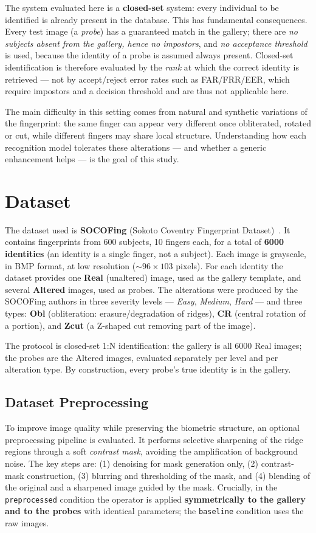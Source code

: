 \documentclass[11pt,a4paper]{article}
\begin{document}
The system evaluated here is a \textbf{closed-set} system: every individual to be
identified is already present in the database. This has fundamental consequences.
Every test image (a \emph{probe}) has a guaranteed match in the gallery; there are
\emph{no subjects absent from the gallery, hence no impostors}, and \emph{no
acceptance threshold} is used, because the identity of a probe is assumed always
present. Closed-set identification is therefore evaluated by the \emph{rank} at
which the correct identity is retrieved --- not by accept/reject error rates such
as FAR/FRR/EER, which require impostors and a decision threshold and are thus not
applicable here.

The main difficulty in this setting comes from natural and synthetic variations
of the fingerprint: the same finger can appear very different once obliterated,
rotated or cut, while different fingers may share local structure. Understanding
how each recognition model tolerates these alterations --- and whether a generic
enhancement helps --- is the goal of this study.

\section{Dataset}
The dataset used is \textbf{SOCOFing} (Sokoto Coventry Fingerprint
Dataset)~\cite{socofing}. It contains fingerprints from \num{600} subjects,
\num{10} fingers each, for a total of \textbf{\num{6000} identities} (an identity
is a single finger, not a subject). Each image is grayscale, in BMP format, at
low resolution ($\sim\!96\times103$ pixels). For each identity the dataset
provides one \textbf{Real} (unaltered) image, used as the gallery template, and
several \textbf{Altered} images, used as probes. The alterations were produced by
the SOCOFing authors in three severity levels --- \emph{Easy}, \emph{Medium},
\emph{Hard} --- and three types: \textbf{Obl} (obliteration: erasure/degradation
of ridges), \textbf{CR} (central rotation of a portion), and \textbf{Zcut} (a
Z-shaped cut removing part of the image).

The protocol is closed-set 1:N identification: the gallery is all \num{6000} Real
images; the probes are the Altered images, evaluated separately per level and per
alteration type. By construction, every probe's true identity is in the gallery.

\subsection{Dataset Preprocessing}
\label{sec:prep}
To improve image quality while preserving the biometric structure, an optional
preprocessing pipeline is evaluated. It performs selective sharpening of the ridge
regions through a soft \emph{contrast mask}, avoiding the amplification of
background noise. The key steps are: (1) denoising for mask generation only, (2)
contrast-mask construction, (3) blurring and thresholding of the mask, and (4)
blending of the original and a sharpened image guided by the mask. Crucially, in
the \texttt{preprocessed} condition the operator is applied \textbf{symmetrically
to the gallery and to the probes} with identical parameters; the
\texttt{baseline} condition uses the raw images.
\end{document}
